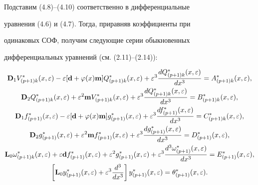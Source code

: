 Подставим (4.8)--(4.10) соответственно в дифференциальные


уравнения (4.6) и (4.7). Тогда, приравняв коэффициенты при


одинаковых СОФ, получим следующие серии обыкновенных


дифференциальных уравнений (см. (2.11)--(2.14)):


\begin{gather}


\bold{D}_1 V_{(p+1)k} ^* (x, \varepsilon) - \varepsilon


[\bold{d} + \varphi (x) \bold{m}] Q_{(p+1)k} ^* (x, \e)


+ \varepsilon^3 \frac{d Q_{(p+1)k} ^* (x, \e)}{d x^3}=


A_{(p+1)k} ^* (x, \e),\notag \\


\bold{D}_2 Q_{(p+1)k} ^* (x, \e)+ \varepsilon^2 \bold{m}


V_{(p+1)k} ^* (x, \e) + \varepsilon^3 \frac{d Q_{(p+1)k}


^* (x, \e)}{d x^3}= B_{(p+1)k} ^* (x, \e),\\


\bold{D}_1 f_{(p+1)} ^* (x, \e) - \varepsilon [\bold{d} +


\varphi (x) \bold{m}] g_{(p+1)} ^* (x, \e) +


\varepsilon^3 \frac{d f_{(p+1)} ^* (x, \e)}{d x^3}=


C_{(p+1)k} ^* (x, \e), \notag \\


\bold{D}_2 g_{(p+1)} ^* (x, \e)+ \varepsilon^2 \bold{m} 


f_{(p+1)} ^* (x, \e) + \varepsilon^3 \frac{d g_{(p+1)} ^* (x,


\e)}{d x^3}= D_{(p+1)} ^* (x, \e),\\


\bold{L}_0 \omega_{(p+1)k} ^* (x, \e) + \e


\bold{d}f_{(p+1)} ^* (x, \e) +\e^2 g_{(p+1)} ^* (x, \e) +


\e^3 \frac{d^3 \omega_{(p+1)} ^* (x, \e)}{d x^3} = E_{(p+1)} 


^* (x, \e),\notag \\


\left[\bold{L}_0 y_{(p+1)} ^* (x, \e)+ \e^3 \frac{d^3}{d x^3}


\right ] y_{(p+1)} ^* (x, \e)= \theta_{(p+1)} ^* (x,


\e).


\end{gather}





